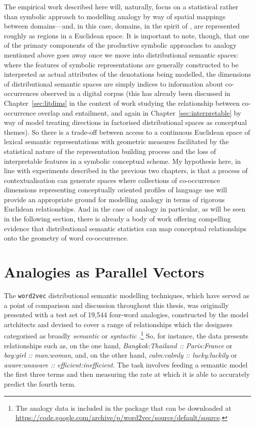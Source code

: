 The empirical work described here will, naturally, focus on a statistical rather than symbolic approach to modelling analogy by way of spatial mappings between domains---and, in this case, domains, in the spirit of \cite{Gardenfors2000}, are represented roughly as regions in a Euclidean space.  It is important to note, though, that one of the primary components of the productive symbolic approaches to analogy mentioned above goes away once we move into distributional semantic spaces: where the features of symbolic representations are generally constructed to be interpreted as actual attributes of the denotations being modelled, the dimensions of distributional semantic spaces are simply indices to information about co-occurrences observed in a digital corpus (this has already been discussed in Chapter~\ref{sec:litdims} in the context of  work studying the relationship between co-occurrence overlap and entailment, and again in Chapter~\ref{sec:interpretable} by way of  model treating directions in factorised distributional spaces as conceptual themes).  So there is a trade-off between access to a continuous Euclidean space of lexical semantic representations with geometric measures facilitated by the statistical nature of the representation building process and the loss of interpretable features in a symbolic conceptual scheme.  My hypothesis here, in line with experiments described in the previous two chapters, is that a process of contextualisation can generate spaces where collections of co-occurrence dimensions representing conceptually oriented profiles of language use will provide an appropriate ground for modelling analogy in terms of rigorous Euclidean relationships.  And in the case of analogy in particular, as will be seen in the following section, there is already a body of work offering compelling evidence that distributional semantic statistics can map conceptual relationships onto the geometry of word co-occurrence.

\section{Analogies as Parallel Vectors}
The \texttt{word2vec} distributional semantic modelling techniques, which have served as a point of comparison and discussion throughout this thesis, was originally presented with a test set of 19,544 four-word analogies, constructed by the model artchitects and devised to cover a range of relationships which the designers categorised as broadly \emph{semantic} or \emph{syntactic} \citep{MikolovEA2013b,MikolovEA2013c}.\footnote{The analogy data is included in the package that can be downloaded at \url{https://code.google.com/archive/p/word2vec/source/default/source}.}  So, for instance, the data presents relationships such as, on the one hand, \emph{Bangkok:Thailand :: Paris:France} or \emph{boy:girl :: man:woman}, and, on the other hand, \emph{calm:calmly :: lucky:luckily} or \emph{aware:unaware :: efficient:inefficient}.  The task involves feeding a semantic model the first three terms and then measuring the rate at which it is able to accurately predict the fourth term.

